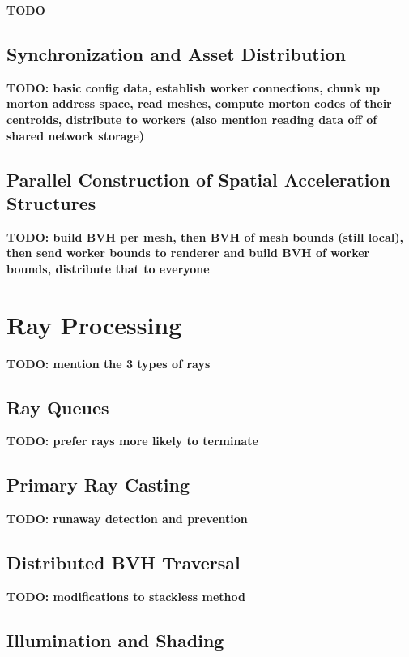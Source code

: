 \documentclass[12pt]{ucthesis}
\begin{document}
\textbf{TODO}

\subsection{Synchronization and Asset Distribution}
\label{config}

\textbf{TODO: basic config data, establish worker connections, chunk up morton address space, read meshes, compute morton codes of their centroids, distribute to workers (also mention reading data off of shared network storage)}

\subsection{Parallel Construction of Spatial Acceleration Structures}
\label{parallbvh}

\textbf{TODO: build BVH per mesh, then BVH of mesh bounds (still local), then send worker bounds to renderer and build BVH of worker bounds, distribute that to everyone}

\section{Ray Processing}
\label{process}

\textbf{TODO: mention the 3 types of rays}

\subsection {Ray Queues}
\label{queues}

\textbf{TODO: prefer rays more likely to terminate}

\subsection{Primary Ray Casting}
\label{primaryrays}

\textbf{TODO: runaway detection and prevention}

\subsection{Distributed BVH Traversal}
\label{traversal}

\textbf{TODO: modifications to stackless method}

\subsection{Illumination and Shading}
\label{shading}
\end{document}
